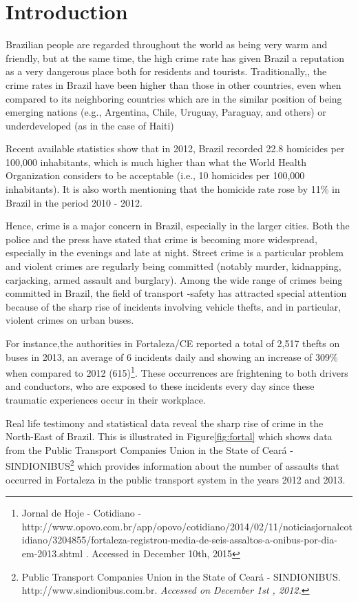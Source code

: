 \chapter{Introduction}

Brazilian people are regarded throughout the world as being very warm and friendly, but at the same time, the high crime rate has given Brazil a reputation as a very dangerous place both for residents and tourists. Traditionally,, the crime rates in Brazil have been higher than those in other countries, even when compared to its neighboring countries which are in the similar position of being emerging nations (e.g., Argentina, Chile, Uruguay, Paraguay, and others) or underdeveloped (as in the case of Haiti)\cite{Harrendorf2010}

Recent available statistics show that in 2012, Brazil recorded 22.8 homicides per 100,000 inhabitants, which is much higher than what the World Health Organization considers to be acceptable (i.e., 10 homicides per 100,000 inhabitants). It is also worth mentioning that the homicide rate rose by 11\% in Brazil in the period 2010 - 2012.\cite{Murray2013}

Hence, crime is a major concern in Brazil, especially in the larger cities. Both the police and the press have stated that crime is becoming more widespread, especially in the evenings and late at night. Street crime is a particular problem\cite{OSAC2015} and violent crimes are regularly being committed (notably murder, kidnapping, carjacking, armed assault and burglary). Among the wide range of crimes being committed in Brazil, the field of transport -safety has attracted special attention because of the sharp rise of incidents involving vehicle thefts, and in particular, violent crimes on urban buses.

For instance,the authorities in Fortaleza/CE reported a total of 2,517 thefts on buses in 2013, an average of 6 incidents daily and showing an increase of 309\% when compared to 2012 (615)\footnote[1]{Jornal de Hoje - Cotidiano - http://www.opovo.com.br/app/opovo/cotidiano/2014/02/11/noticiasjornalcotidiano/3204855/fortaleza-registrou-media-de-seis-assaltos-a-onibus-por-dia-em-2013.shtml . Accessed in December 10th, 2015}. These occurrences are frightening to both drivers and conductors, who are exposed to these incidents every day since these traumatic experiences occur in their workplace.

Real life testimony and statistical data reveal the sharp rise of crime in the North-East of Brazil. This is illustrated in Figure\ref{fig:fortal} which shows data from the Public Transport Companies Union in the State of Ceará - SINDIONIBUS\footnote[2]{Public Transport Companies Union in the State of Ceará - SINDIONIBUS. http://www.sindionibus.com.br. \textit{Accessed on December 1st , 2012.}} which provides information about the number of assaults that occurred in Fortaleza in the public transport system in the years 2012 and 2013.

